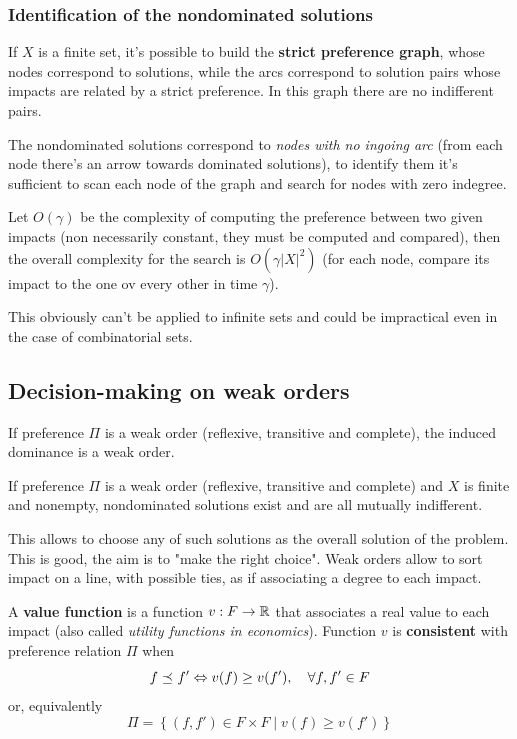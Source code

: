 \subsubsection{Identification of the nondominated solutions}

If $X$ is a finite set, it's possible to build the \textbf{strict preference graph}, whose nodes correspond to solutions, while the arcs correspond to solution pairs whose impacts are related by a strict preference. In this graph there are no indifferent pairs. 

The nondominated solutions correspond to \textit{nodes with no ingoing arc} (from each node there's an arrow towards dominated solutions), to identify them it's sufficient to scan each node of the graph and search for nodes with zero indegree.

Let $O(\gamma)$ be the complexity of computing the preference between two given impacts (non necessarily constant, they must be computed and compared), then the overall complexity for the search is $O\left(\gamma |X|^2\right)$ (for each node, compare its impact to the one ov every other in time $\gamma$).

This obviously can't be applied to infinite sets and could be impractical even in the case of combinatorial sets.

\subsection{Decision-making on weak orders}
\label{subsec:decisionmakingweakorders}

\begin{theo}
	If preference $\Pi$ is a weak order (reflexive, transitive and complete), the induced dominance is a weak order. \\
\end{theo}

\begin{theo}
	If preference $\Pi$ is a weak order (reflexive, transitive and complete) and $X$ is finite and nonempty, nondominated solutions exist and are all mutually indifferent.
\end{theo}

This allows to choose any of such solutions as the overall solution of the problem. This is good, the aim is to "make the right choice". Weak orders allow to sort impact on a line, with possible ties, as if associating a degree to each impact.

\begin{definition}
	A \textbf{value function} is a function $v: F \rightarrow \operatorname{\mathbb{R}}$ that associates a real value to each impact (also called \textit{utility functions in economics}). Function $v$ is \textbf{consistent} with preference relation $\Pi$ when 
	$$ f \preceq_{} f' \Leftrightarrow v(f) \geq v(f'), \quad \forall f,f' \in F$$
	or, equivalently
	$$ \Pi = \left\{(f, f') \in F \times F \mid v(f) \geq v(f') \right\} $$
\end{definition}


